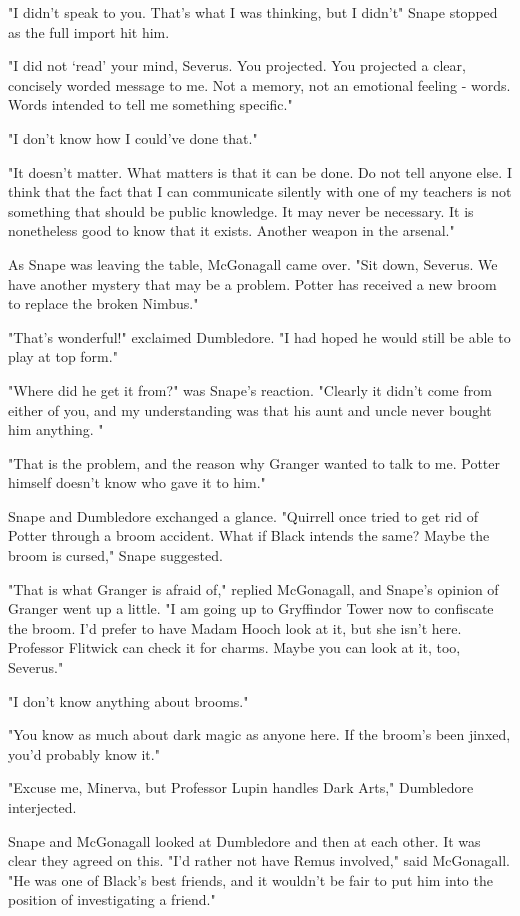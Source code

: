 "I didn't speak to you. That's what I was thinking, but I didn't{\el}" Snape stopped as the full import hit him.

"I did not `read' your mind, Severus. You projected. You projected a clear, concisely worded message to me. Not a memory, not an emotional feeling - words. Words intended to tell me something specific."

"I don't know how I could've done that."

"It doesn't matter. What matters is that it can be done. Do not tell anyone else. I think that the fact that I can communicate silently with one of my teachers is not something that should be public knowledge. It may never be necessary. It is nonetheless good to know that it exists. Another weapon in the arsenal."

As Snape was leaving the table, McGonagall came over. "Sit down, Severus. We have another mystery that may be a problem. Potter has received a new broom to replace the broken Nimbus."

"That's wonderful!" exclaimed Dumbledore. "I had hoped he would still be able to play at top form."

"Where did he get it from?" was Snape's reaction. "Clearly it didn't come from either of you, and my understanding was that his aunt and uncle never bought him anything. "

"That is the problem, and the reason why Granger wanted to talk to me. Potter himself doesn't know who gave it to him."

Snape and Dumbledore exchanged a glance. "Quirrell once tried to get rid of Potter through a broom accident. What if Black intends the same? Maybe the broom is cursed," Snape suggested.

"That is what Granger is afraid of," replied McGonagall, and Snape's opinion of Granger went up a little. "I am going up to Gryffindor Tower now to confiscate the broom. I'd prefer to have Madam Hooch look at it, but she isn't here. Professor Flitwick can check it for charms. Maybe you can look at it, too, Severus."

"I don't know anything about brooms."

"You know as much about dark magic as anyone here. If the broom's been jinxed, you'd probably know it."

"Excuse me, Minerva, but Professor Lupin handles Dark Arts," Dumbledore interjected.

Snape and McGonagall looked at Dumbledore and then at each other. It was clear they agreed on this. "I'd rather not have Remus involved," said McGonagall. "He was one of Black's best friends, and it wouldn't be fair to put him into the position of investigating a friend."

